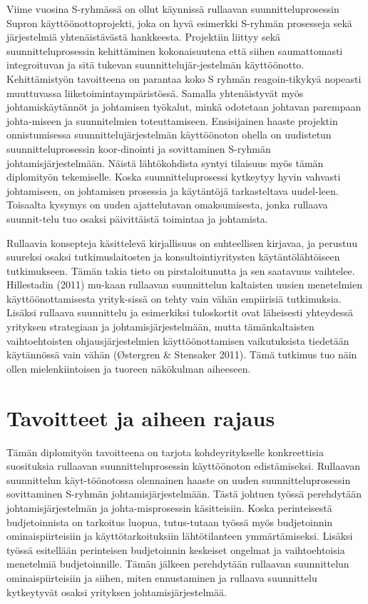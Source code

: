 \documentclass[12pt,a4paper,oneside,pdftex]{report}
\begin{document}
Viime vuosina S-ryhmässä on ollut käynnissä rullaavan suunnitteluprosessin Supron käyttöönottoprojekti, joka on hyvä esimerkki S-ryhmän prosesseja sekä järjestelmiä yhtenäistävästä hankkeesta. Projektiin liittyy sekä suunnitteluprosessin kehittäminen kokonaisuutena että siihen saumattomasti integroituvan ja sitä tukevan suunnittelujär-jestelmän käyttöönotto. Kehittämistyön tavoitteena on parantaa koko S ryhmän reagoin-tikykyä nopeasti muuttuvassa liiketoimintaympäristössä. Samalla yhtenäistyvät myös johtamiskäytännöt ja johtamisen työkalut, minkä odotetaan johtavan parempaan johta-miseen ja suunnitelmien toteuttamiseen. Ensisijainen haaste projektin onnistumisessa suunnittelujärjestelmän käyttöönoton ohella on uudistetun suunnitteluprosessin koor-dinointi ja sovittaminen S-ryhmän johtamisjärjestelmään. Näistä lähtökohdista syntyi tilaisuus myös tämän diplomityön tekemiselle. Koska suunnitteluprosessi kytkeytyy hyvin vahvasti johtamiseen, on johtamisen prosessia ja käytäntöjä tarkasteltava uudel-leen. Toisaalta kysymys on uuden ajattelutavan omaksumisesta, jonka rullaava suunnit-telu tuo osaksi päivittäistä toimintaa ja johtamista.

Rullaavia konsepteja käsittelevä kirjallisuus on suhteellisen kirjavaa, ja perustuu suureksi osaksi tutkimuslaitosten ja konsultointiyritysten käytäntölähtöiseen tutkimukseen. Tämän takia tieto on pirstaloitunutta ja sen saatavuus vaihtelee. Hillestadin (2011) mu-kaan rullaavan suunnittelun kaltaisten uusien menetelmien käyttöönottamisesta yrityk-sissä on tehty vain vähän empiirisiä tutkimuksia. Lisäksi rullaava suunnittelu ja esimerkiksi tuloskortit ovat läheisesti yhteydessä yrityksen strategiaan ja johtamisjärjestelmään, mutta tämänkaltaisten vaihtoehtoisten ohjausjärjestelmien käyttöönottamisen vaikutuksista tiedetään käytännössä vain vähän (Østergren & Stensaker 2011). Tämä tutkimus tuo näin ollen mielenkiintoisen ja tuoreen näkökulman aiheeseen.

\section{Tavoitteet ja aiheen rajaus}
\label{section:structure}

Tämän diplomityön tavoitteena on tarjota kohdeyritykselle konkreettisia suosituksia rullaavan suunnitteluprosessin käyttöönoton edistämiseksi. Rullaavan suunnittelun käyt-töönotossa olennainen haaste on uuden suunnitteluprosessin sovittaminen S-ryhmän johtamisjärjestelmään. Tästä johtuen työssä perehdytään johtamisjärjestelmän ja johta-misprosessin käsitteisiin. Koska perinteisestä budjetoinnista on tarkoitus luopua, tutus-tutaan työssä myös budjetoinnin ominaispiirteisiin ja käyttötarkoituksiin lähtötilanteen ymmärtämiseksi. Lisäksi työssä esitellään perinteisen budjetoinnin keskeiset ongelmat ja vaihtoehtoisia menetelmiä budjetoinnille. Tämän jälkeen perehdytään rullaavan suunnittelun ominaispiirteisiin ja siihen, miten ennustaminen ja rullaava suunnittelu kytkeytyvät osaksi yrityksen johtamisjärjestelmää.
\end{document}
